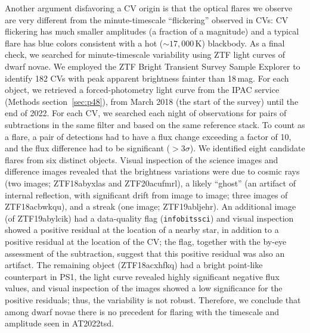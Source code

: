 \documentclass{nature_plusfigure}
\newcommand{\at}{AT2022tsd}
\begin{document}
\begin{methods}
Another argument disfavoring a CV origin is that the optical flares we observe are very different from the minute-timescale ``flickering'' observed in CVs: CV flickering has much smaller amplitudes (a fraction of a magnitude\cite{Bruch2021}) and a typical flare has blue colors consistent with a hot ($\sim17,000\,$K) blackbody\cite{Bruch2021}.
As a final check, we searched for minute-timescale variability using ZTF light curves of dwarf novae. 
We employed the ZTF Bright Transient Survey\cite{FremlingBTS} Sample Explorer\cite{PerleyBTS} to identify 182 CVs with peak apparent brightness fainter than 18\,mag.
For each object, we retrieved a forced-photometry light curve from the IPAC service (Methods section~\ref{sec:p48}), from March 2018 (the start of the survey) until the end of 2022. For each CV, we searched each night of observations for pairs of subtractions in the same filter and based on the same reference stack.
To count as a flare, a pair of detections had to have a flux change exceeding a factor of 10, and the flux difference had to be significant ($>3\sigma$).
We identified eight candidate flares from six distinct objects. Visual inspection of the science images and difference images revealed that the brightness variations were due to cosmic rays (two images; ZTF18abyxlas and ZTF20acufmrl), a likely ``ghost'' (an artifact of internal reflection, with significant drift from image to image; three images of ZTF18acbwkqu), and a streak (one image; ZTF19abljehr). An additional image (of ZTF19abylcik) had a data-quality flag (\texttt{infobitssci}) and visual inspection showed a positive residual at the location of a nearby star, in addition to a positive residual at the location of the CV; the flag, together with the by-eye assessment of the subtraction, suggest that this positive residual was also an artifact. The remaining object (ZTF18acxhfkq) had a bright point-like counterpart in PS1, the light curve revealed highly significant negative flux values, and visual inspection of the images showed a low significance for the positive residuals; thus, the variability is not robust.  
Therefore, we conclude that among dwarf novae there is no precedent for flaring with the timescale and amplitude seen in \at.


\end{methods}
\end{document}
